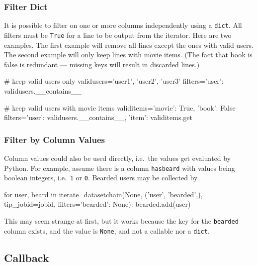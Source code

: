 \subsubsection*{Filter Dict}

It is possible to filter on one or more columns independently using a
\texttt{dict}.  All filters must be \texttt{True} for a line to be
output from the iterator.  Here are two examples.  The first example
will remove all lines except the ones with valid users.  The second
example will only keep lines with movie items.  (The fact that book is
false is redundant --- missing keys will result in discarded lines.)

\begin{python}
# keep valid users only
validusers={'user1', 'user2', 'user3'}
filters={'user': validusers.__contains__}

# keep valid users with movie items
validitems={'movie': True, 'book': False}
filters={'user': validusers.__contains__, 'item': validitems.get}
\end{python}




\subsubsection*{Filter by Column Values}


Column values could also be used directly, i.e.\ the values get
evaluated by Python.  For example, assume there is a column
\texttt{hasbeard} with values being boolean integers, i.e.\ \texttt{1}
or \texttt{0}.  Bearded users may be collected by
\begin{python}
for user, beard in iterate_datasetchain(None, ('user', 'bearded',), tip_jobid=jobid,
                                       filters={'bearded': None}):
    bearded.add(user)
\end{python}
This may seem strange at first, but it works because the key
for the \texttt{bearded} column exists, and the value is
\texttt{None}, and not a callable nor a \texttt{dict}.





    


\subsection{Callback}
\label{sec:callback}

